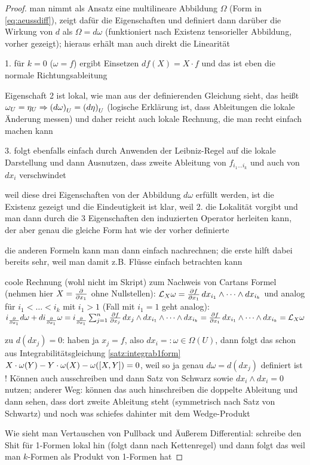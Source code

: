 \documentclass[../H_Analysis_main.tex]{subfiles}
\begin{document}
\begin{proof}
man nimmt als Ansatz eine multilineare Abbildung $\Omega$ (Form in \eqref{eq:aeussdiff}), zeigt dafür die Eigenschaften und definiert dann darüber die Wirkung von $d$ als $\Omega = d\omega$ (funktioniert nach Existenz tensorieller Abbildung, vorher gezeigt); hieraus erhält man auch direkt die Linearität


1. für $k = 0$ ($\omega = f$) ergibt Einsetzen $df(X) = X \cdot f$ und das ist eben die normale Richtungsableitung

Eigenschaft 2 ist lokal, wie man aus der definierenden Gleichung sieht, das heißt $\omega_U = \eta_U \Rightarrow \qty(d\omega)_U = \qty(d\eta)_U$ (logische Erklärung ist, dass Ableitungen die lokale Änderung messen) und daher reicht auch lokale Rechnung, die man recht einfach machen kann

3. folgt ebenfalls einfach durch Anwenden der Leibniz-Regel auf die lokale Darstellung und dann Ausnutzen, dass zweite Ableitung von $f_{i_1 \dots i_k}$ und auch von $dx_i$ verschwindet


weil diese drei Eigenschaften von der Abbildung $d\omega$ erfüllt werden, ist die Existenz gezeigt und die Eindeutigkeit ist klar, weil 2. die Lokalität vorgibt und man dann durch die 3 Eigenschaften den induzierten Operator herleiten kann, der aber genau die gleiche Form hat wie der vorher definierte

die anderen Formeln kann man dann einfach nachrechnen; die erste hilft dabei bereits sehr, weil man damit z.B. Flüsse einfach betrachten kann


coole Rechnung (wohl nicht im Skript) zum Nachweis von Cartans Formel (nehmen hier $X = \pdv{x_1}$ ohne Nullstellen): $\mathcal{L}_X \omega = \pdv{f}{x_1} \, dx_{i_1} \wedge \dots \wedge dx_{i_k}$ und analog für $i_1 < \dots < i_k$ mit $i_1 > 1$ (Fall mit $i_1 = 1$ geht analog): $i_{\pdv{x_1}} d\omega + d i_{\pdv{x_1}} \omega = i_{\pdv{x_1}} \sum_{j = 1}^n \pdv{f}{x_j} \, dx_j \wedge dx_{i_1} \wedge \dots \wedge dx_{i_k} = \pdv{f}{x_1} \, dx_{i_1} \wedge \dots \wedge dx_{i_k} = \mathcal{L}_X \omega$


zu $d(dx_j) = 0$: haben ja $x_j = f$, also $dx_i =: \omega \in \Omega(U)$, dann folgt das schon aus Integrabilitätsgleichung \eqref{satz:integrab1form} $X \cdot \omega(Y) - Y \cdot \omega(X) - \omega\qty([X, Y]) = 0$, weil so ja genau $d\omega = d(dx_j)$ definiert ist ! Können auch ausschreiben und dann Satz von Schwarz sowie $dx_i \wedge dx_i = 0$ nutzen; anderer Weg: können das auch hinschreiben die doppelte Ableitung und dann sehen, dass dort zweite Ableitung steht (symmetrisch nach Satz von Schwartz) und noch was schiefes dahinter mit dem Wedge-Produkt

Wie sieht man Vertauschen von Pullback und Äußerem Differential: schreibe den Shit für 1-Formen lokal hin (folgt dann nach Kettenregel) und dann folgt das weil man $k$-Formen als Produkt von 1-Formen hat
\end{proof}
\end{document}

